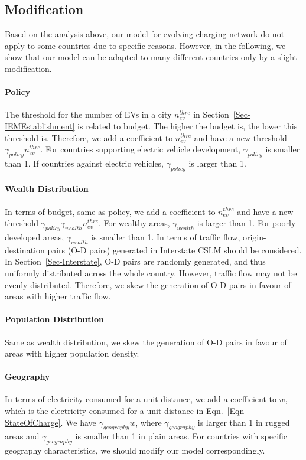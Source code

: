 \documentclass{mcmthesis}
\begin{document}
\subsection{Modification}
Based on the analysis above, our model for evolving charging network do not apply to some countries due to specific reasons. However, in the following, we show that our model can be adapted to many different countries only by a slight modification.

\paragraph{Policy}
The threshold for the number of EVs in a city $n_{ev}^{thre}$ in Section~\ref{Sec-IEMEstablishment} is related to budget. The higher the budget is, the lower this threshold is. Therefore, we add a coefficient to $n_{ev}^{thre}$ and have a new threshold $\gamma_{policy}n_{ev}^{thre}$. For countries supporting electric vehicle development, $\gamma_{policy}$ is smaller than 1. If countries against electric vehicles, $\gamma_{policy}$ is larger than 1.

\paragraph{Wealth Distribution}
In terms of budget, same as policy, we add a coefficient to $n_{ev}^{thre}$ and have a new threshold $\gamma_{policy}\gamma_{wealth}n_{ev}^{thre}$. For wealthy areas, $\gamma_{wealth}$ is larger than 1. For poorly developed areas, $\gamma_{wealth}$ is smaller than 1. In terms of traffic flow, origin-destination pairs (O-D pairs) generated in Interstate CSLM should be considered. In Section~\ref{Sec-Interstate}, O-D pairs are randomly generated, and thus uniformly distributed across the whole country. However, traffic flow may not be evenly distributed. Therefore, we skew the generation of O-D pairs in favour of areas with higher traffic flow.

\paragraph{Population Distribution}
Same as wealth distribution, we skew the generation of O-D pairs in favour of areas with higher population density.

\paragraph{Geography}
In terms of electricity consumed for a unit distance, we add a coefficient to $w$, which is the electricity consumed for a unit distance in Eqn.~\eqref{Eqn-StateOfCharge}. We have $\gamma_{geography}w$, where $\gamma_{geography}$ is larger than 1 in rugged areas and $\gamma_{geography}$ is smaller than 1 in plain areas. For countries with specific geography characteristics, we should modify our model correspondingly.
\end{document}
